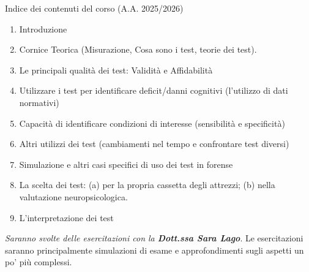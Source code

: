 \documentclass[
  ignorenonframetext,
  aspectratio=169,
]{beamer}
\author{Giorgio Arcara}
\date{}
\providecommand{\tightlist}{%
  \setlength{\itemsep}{0pt}\setlength{\parskip}{0pt}}
\begin{document}
\begin{frame}{Indice dei contenuti del corso (A.A. 2025/2026)}
\label{indice-dei-contenuti-del-corso-a.a.-20252026}
\scriptsize

\begin{enumerate}
\tightlist
\item
  Introduzione
\item
  Cornice Teorica (Misurazione, Cosa sono i test, teorie dei test).
\item
  Le principali qualità dei test: Validità e Affidabilità
\item
  Utilizzare i test per identificare deficit/danni cognitivi (l'utilizzo
  di dati normativi)
\item
  Capacità di identificare condizioni di interesse (sensibilità e
  specificità)
\item
  Altri utilizzi dei test (cambiamenti nel tempo e confrontare test
  diversi)
\item
  Simulazione e altri casi specifici di uso dei test in forense
\item
  La scelta dei test: (a) per la propria cassetta degli attrezzi; (b)
  nella valutazione neuropsicologica.
\item
  L'interpretazione dei test
\end{enumerate}

\emph{Saranno svolte delle esercitazioni con la \textbf{Dott.ssa Sara
Lago}}. Le esercitazioni saranno principalmente simulazioni di esame e
approfondimenti sugli aspetti un po' più complessi.
\end{frame}
\end{document}
